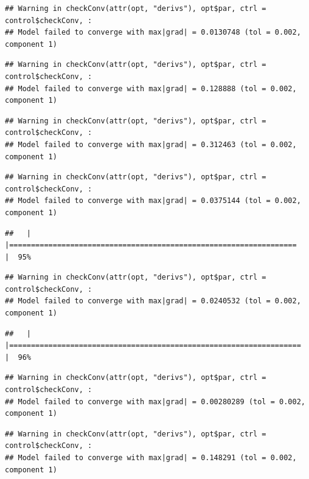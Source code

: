 \documentclass[
  12pt,
]{book}
\begin{document}
\begin{verbatim}
## Warning in checkConv(attr(opt, "derivs"), opt$par, ctrl = control$checkConv, :
## Model failed to converge with max|grad| = 0.0130748 (tol = 0.002, component 1)
\end{verbatim}

\begin{verbatim}
## Warning in checkConv(attr(opt, "derivs"), opt$par, ctrl = control$checkConv, :
## Model failed to converge with max|grad| = 0.128888 (tol = 0.002, component 1)
\end{verbatim}

\begin{verbatim}
## Warning in checkConv(attr(opt, "derivs"), opt$par, ctrl = control$checkConv, :
## Model failed to converge with max|grad| = 0.312463 (tol = 0.002, component 1)
\end{verbatim}

\begin{verbatim}
## Warning in checkConv(attr(opt, "derivs"), opt$par, ctrl = control$checkConv, :
## Model failed to converge with max|grad| = 0.0375144 (tol = 0.002, component 1)
\end{verbatim}

\begin{verbatim}
##   |                                                                              |==================================================================    |  95%
\end{verbatim}

\begin{verbatim}
## Warning in checkConv(attr(opt, "derivs"), opt$par, ctrl = control$checkConv, :
## Model failed to converge with max|grad| = 0.0240532 (tol = 0.002, component 1)
\end{verbatim}

\begin{verbatim}
##   |                                                                              |===================================================================   |  96%
\end{verbatim}

\begin{verbatim}
## Warning in checkConv(attr(opt, "derivs"), opt$par, ctrl = control$checkConv, :
## Model failed to converge with max|grad| = 0.00280289 (tol = 0.002, component 1)
\end{verbatim}

\begin{verbatim}
## Warning in checkConv(attr(opt, "derivs"), opt$par, ctrl = control$checkConv, :
## Model failed to converge with max|grad| = 0.148291 (tol = 0.002, component 1)
\end{verbatim}
\end{document}
